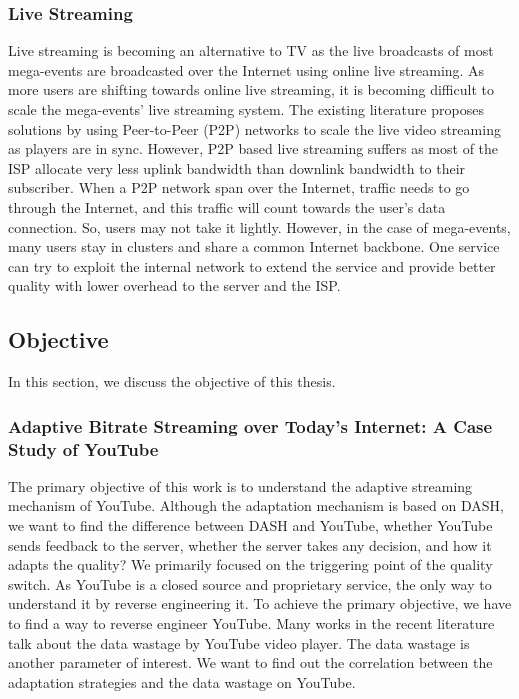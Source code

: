 \subsubsection{Live Streaming}
Live streaming is becoming an alternative to TV as the live broadcasts of most mega-events are broadcasted over the Internet using online live streaming. As more users are shifting towards online live streaming, it is becoming difficult to scale the mega-events' live streaming system. The existing literature proposes solutions by using Peer-to-Peer (P2P) networks to scale the live video streaming as players are in sync. However, P2P based live streaming suffers as most of the ISP allocate very less uplink bandwidth than downlink bandwidth to their subscriber.
When a P2P network span over the Internet, traffic needs to go through the Internet, and this traffic will count towards the user's data connection. So, users may not take it lightly. However, in the case of mega-events, many users stay in clusters and share a common Internet backbone. One service can try to exploit the internal network to extend the service and provide better quality with lower overhead to the server and the ISP.


\subsection{Objective}
In this section, we discuss the objective of this thesis.

\subsubsection{Adaptive Bitrate Streaming over Today's Internet: A Case Study of YouTube}
The primary objective of this work is to understand the adaptive streaming mechanism of YouTube. Although the adaptation mechanism is based on DASH, we want to find the difference between DASH and YouTube, whether YouTube sends feedback to the server, whether the server takes any decision, and how it adapts the quality? We primarily focused on the triggering point of the quality switch. As YouTube is a closed source and proprietary service, the only way to understand it by reverse engineering it. To achieve the primary objective, we have to find a way to reverse engineer YouTube. Many works in the recent literature talk about the data wastage by YouTube video player. The data wastage is another parameter of interest. We want to find out the correlation between the adaptation strategies and the data wastage on YouTube.

